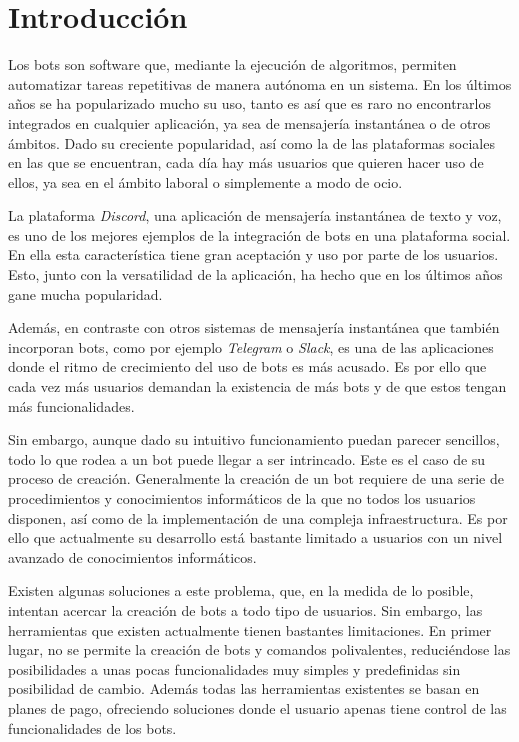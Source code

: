 \chapter{Introducción}

Los bots son software que, mediante la ejecución de algoritmos, permiten automatizar tareas repetitivas de manera autónoma en un sistema. En los últimos años se ha popularizado mucho su uso, tanto es así que es raro no encontrarlos integrados en cualquier aplicación, ya sea de mensajería instantánea o de otros ámbitos. Dado su creciente popularidad, así como la de las plataformas sociales en las que se encuentran, cada día hay más usuarios que quieren hacer uso de ellos, ya sea en el ámbito laboral o simplemente a modo de ocio.

La plataforma \textit{Discord}, una aplicación de mensajería instantánea de texto y voz, es uno de los mejores ejemplos de la integración de bots en una plataforma social. En ella esta característica tiene gran aceptación y uso por parte de los usuarios. Esto, junto con la versatilidad de la aplicación, ha hecho que en los últimos años gane mucha popularidad\cite{tsbb}. 

Además, en contraste con otros sistemas de mensajería instantánea que también incorporan bots, como por ejemplo \textit{Telegram} o \textit{Slack}, es una de las aplicaciones donde el ritmo de crecimiento del uso de bots es más acusado\cite{enlyft}. Es por ello que cada vez más usuarios demandan la existencia de más bots y de que estos tengan más funcionalidades.

Sin embargo, aunque dado su intuitivo funcionamiento puedan parecer sencillos, todo lo que rodea a un bot puede llegar a ser intrincado. Este es el caso de su proceso de creación. Generalmente la creación de un bot requiere de una serie de procedimientos y conocimientos informáticos de la que no todos los usuarios disponen, así como de la implementación de una compleja infraestructura. Es por ello que actualmente su desarrollo está bastante limitado a usuarios con un nivel avanzado de conocimientos informáticos.

Existen algunas soluciones a este problema, que, en la medida de lo posible, intentan acercar la creación de bots a todo tipo de usuarios. Sin embargo, las herramientas que existen actualmente tienen bastantes limitaciones. En primer lugar, no se permite la creación de bots y comandos polivalentes, reduciéndose las posibilidades a unas pocas funcionalidades muy simples y predefinidas sin posibilidad de cambio. Además todas las herramientas existentes se basan en planes de pago, ofreciendo soluciones donde el usuario apenas tiene control de las funcionalidades de los bots.


